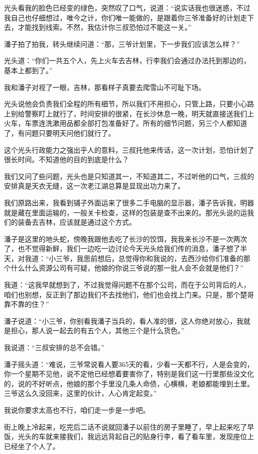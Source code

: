 光头看我的脸色已经变的绿色，突然叹了口气，说道：“说实话我也很迷惑，不过我自己也仔细想过，唯今之计，你们唯一能做的，是跟着你三爷准备好的计划走下去，才能找到线索。不然，我估计你三叔恐怕过不能这一关。”

潘子拍了拍我，转头继续问道：“那，三爷计划里，下一步我们应该怎么样？”

光头道：“你们一共五个人，先上火车去吉林，行李我们会通过办法托到那边的，基本上都到了。”

我和潘子对视了一眼，吉林，那看样子真要去爬雪山不可耻下场。

光头说他会负责我们全程的所有细节，所以我们不用担心，只管上路，只要小心路上别给警察盯上就行了，时间安排的很紧，在长沙休息一晚，明天就直接送我们上火车，车票连洗漱用品都全部打包准备好了。所有的细节问题，另三个人都知道了，有问题只要明天问他们就行了。

这个光头行政能力之强出乎人的意料，三叔托他来传话，这一次计划，恐怕计划了很长时间。不知道他的目的到底是什么？

我们又问了些问题，光头也是只知道其一，不知道其二，不过听他的口气，三叔的安排真是天衣无缝，这一次老江湖总算是显现出功力来了。

我们原路出来，我看到铺子外面运来了很多二手电脑的显示器，潘子告诉我，明器就是藏在里面运输的，一般关卡检查，这样的包装是查不出来的。那光头说的运我们的装备去吉林，应该就是通过这个方式。

潘子是这里的地头蛇，傍晚我跟他去吃了长沙的饺饵，我我来长沙不是一次两次了，也不觉得新鲜，我们一边吃一边讨论今天光头给我们传的消息，潘子想了半天，对我道：“小三爷，我思前想后，总觉得你和我说的，去西沙给你们准备的那个什么什么资源公司有可疑，他娘的你说三爷说的那一批人会不会就是他们？”

我道：“这我早就想到了，不过我觉得问题不在那个公司，而在于公司背后的人，咱们也别想，反正到了那边我们不去找他们，他们也会找上门来。只是，那个楚哥靠不靠的住？”

潘子说道：“小三爷，你别看我潘子当兵的，看人准的很，这人你绝对放心，我就是担心，那人说一起去的有五个人，其他三个是什么货色。”

我说道：“三叔安排的总不会错。”

潘子摇头道：“难说，三爷常说看人要365天的看，少看一天都不行，人是会变的，你一个星期不见他，说不定他已经想着要害你了，特别是我们这一行里那些没文化的，说的不好听点，他娘的那个手里没几条人命债，心横横，老娘都能埋到土里。三爷这么久没回来，这里的伙计，人心肯定起变。”

我说你要求太高也不行，咱们走一步是一步吧。

街上晚上冷起来，吃完后二话不说就回潘子以前住的房子里睡了，早上起来吃了早饭，光头的车就来接我们，我远远背起自己的贴身行李，看了看车里，发现座位上已经坐了个人了。

